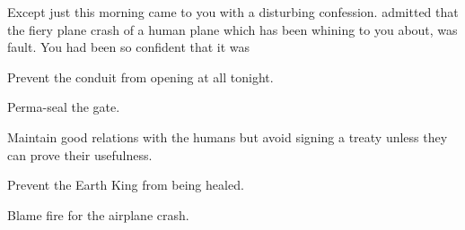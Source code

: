\documentclass[char]{elementals}
\begin{document}
Except just this morning \cNaturalist{} came to you with a disturbing confession.  admitted that the fiery plane crash of a human plane which \cLeader{} has been whining to you about, was \cNaturalist{\their} fault. You had been so confident that it was 


\begin{itemz}[Goals]
	\item  Prevent the conduit from opening at all tonight.
	\item  Perma-seal the gate. 
	\item  Maintain good relations with the humans but avoid signing a treaty unless they can prove their usefulness.
	\item  Prevent the Earth King from being healed.
	\item  Blame fire for the airplane crash.
\end{itemz}

\begin{contacts}
	\contact{\cLeader{}}
	
\end{contacts} 
\end{document}
